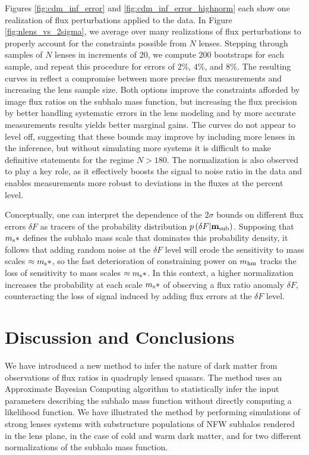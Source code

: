 Figures \ref{fig:cdm_inf_error} and \ref{fig:cdm_inf_error_highnorm} each show one realization of flux perturbations applied to the data. In Figure \ref{fig:nlens_vs_2sigma}, we average over many realizations of flux perturbations to properly account for the constraints possible from $N$ lenses. Stepping through samples of $N$ lenses in increments of 20, we compute 200 bootstraps for each sample, and repeat this procedure for errors of $2\%$, $4\%$, and $8\%$. The resulting curves in reflect a compromise between more precise flux measurements and increasing the lens sample size. Both options improve the constraints afforded by image flux ratios on the subhalo mass function, but increasing the flux precision by better handling systematic errors in the lens modeling and by more accurate measurements results yields better marginal gains. The curves do not appear to level off, suggesting that these bounds may improve by including more lenses in the inference, but without simulating more systems it is difficult to make definitive statements for the regime $N>180$. The normalization is also observed to play a key role, as it effectively boosts the signal to noise ratio in the data and enables measurements more robust to deviations in the fluxes at the percent level.

Conceptually, one can interpret the dependence of the $2 \sigma$ bounds on different flux errors $\delta {F}$ as tracers of the probability distribution $p\left(\delta F | {\bf{m}_{\rm{sub}}}\right)$. Supposing that $m_{\rm{s}}*$ defines the subhalo mass scale that dominates this probability density, it follows that adding random noise at the $\delta F$ level will erode the sensitivity to mass scales $\approx m_{\rm{s}}*$, so the fast deterioration of constraining power on $m_{\rm{hm}}$ tracks the loss of sensitivity to mass scales $\approx m_{\rm{s}}*$. In this context, a higher normalization increases the probability at each scale $m_{\rm{s}}*$ of observing a flux ratio anomaly $\delta F$, counteracting the loss of signal induced by adding flux errors at the $\delta F$ level.

\section{Discussion and Conclusions}

We have introduced a new method to infer the nature of dark matter from observations of flux ratios in quadruply lensed quasars. The method uses an Approximate Bayesian Computing algorithm to statistically infer the input parameters describing the subhalo mass function without directly computing a likelihood function.  We have illustrated the method by performing simulations of strong lenses systems with substructure populations of NFW subhalos rendered in the lens plane, in the case of cold and warm dark matter, and for two different normalizations of the subhalo mass function. 


